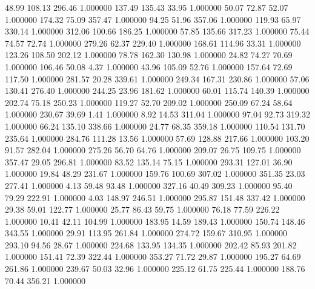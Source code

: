      48.99    108.13    296.46  1.000000
    137.49    135.43     33.95  1.000000
     50.07     72.87     52.07  1.000000
    174.32     75.09    357.47  1.000000
     94.25     51.96    357.06  1.000000
    119.93     65.97    330.14  1.000000
    312.06    100.66    186.25  1.000000
     57.85    135.66    317.23  1.000000
     75.44     74.57     72.74  1.000000
    279.26     62.37    229.40  1.000000
    168.61    114.96     33.31  1.000000
    123.26    108.50    202.12  1.000000
     78.78    162.30    130.98  1.000000
     24.82     74.27     70.69  1.000000
    106.46     50.08      4.37  1.000000
     43.96    105.09     52.76  1.000000
    157.64     72.69    117.50  1.000000
    281.57     20.28    339.61  1.000000
    249.34    167.31    230.86  1.000000
     57.06    130.41    276.40  1.000000
    244.25     23.96    181.62  1.000000
     60.01    115.74    140.39  1.000000
    202.74     75.18    250.23  1.000000
    119.27     52.70    209.02  1.000000
    250.09     67.24     58.64  1.000000
    230.67     39.69      1.41  1.000000
      8.92     14.53    311.04  1.000000
     97.04     92.73    319.32  1.000000
     66.24    135.10    338.66  1.000000
     24.77     68.35    359.18  1.000000
    110.54    131.70    235.64  1.000000
    284.76    111.28     13.56  1.000000
     57.69    128.88    217.66  1.000000
    103.20     91.57    282.04  1.000000
    275.26     56.70     64.76  1.000000
    209.07     26.75    109.75  1.000000
    357.47     29.05    296.81  1.000000
     83.52    135.14     75.15  1.000000
    293.31    127.01     36.90  1.000000
     19.84     48.29    231.67  1.000000
    159.76    100.69    307.02  1.000000
    351.35     23.03    277.41  1.000000
      4.13     59.48     93.48  1.000000
    327.16     40.49    309.23  1.000000
     95.40     79.29    222.91  1.000000
      4.03    148.97    246.51  1.000000
    295.87    151.48    337.42  1.000000
     29.38     59.01    122.77  1.000000
     25.77     86.43     59.75  1.000000
     76.18     77.59    226.22  1.000000
     10.41     42.11    104.99  1.000000
    183.95     14.59    189.43  1.000000
    150.74    148.46    343.55  1.000000
     29.91    113.95    261.84  1.000000
    274.72    159.67    310.95  1.000000
    293.10     94.56     28.67  1.000000
    224.68    133.95    134.35  1.000000
    202.42     85.93    201.82  1.000000
    151.41     72.39    322.44  1.000000
    353.27     71.72     29.87  1.000000
    195.27     64.69    261.86  1.000000
    239.67     50.03     32.96  1.000000
    225.12     61.75    225.44  1.000000
    188.76     70.44    356.21  1.000000
